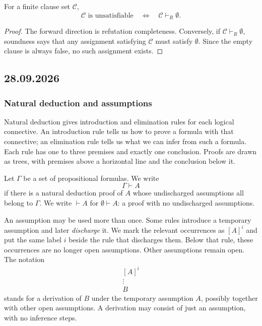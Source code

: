 \documentclass[11pt,a4paper]{amsart}
\begin{document}
\begin{corollary}
  For a finite clause set \(\mathcal C\),
  \[
    \mathcal C\text{ is unsatisfiable}
    \quad\Longleftrightarrow\quad
    \mathcal C\vdash_R\emptyset.
  \]
\end{corollary}

\begin{proof}
  The forward direction is refutation completeness. Conversely, if
  \(\mathcal C\vdash_R\emptyset\), soundness says that any assignment
  satisfying \(\mathcal C\) must satisfy \(\emptyset\). Since the empty
  clause is always false, no such assignment exists.
\end{proof}

\subsection{28.09.2026}

\subsubsection{Natural deduction and assumptions}

Natural deduction gives introduction and elimination rules for each logical
connective. An introduction rule tells us how to prove a formula with that
connective; an elimination rule tells us what we can infer from such a
formula. Each rule has one to three premises and exactly one conclusion.
Proofs are drawn as trees, with premises above a horizontal line and the
conclusion below it.

\begin{definition}[Derivability]
  Let \(\Gamma\) be a set of propositional formulas. We write
  \[
    \Gamma\vdash A
  \]
  if there is a natural deduction proof of \(A\) whose undischarged
  assumptions all belong to \(\Gamma\). We write \(\vdash A\) for
  \(\emptyset\vdash A\): a proof with no undischarged assumptions.
\end{definition}

An assumption may be used more than once. Some rules introduce a temporary
assumption and later \emph{discharge} it. We mark the relevant occurrences
as \([A]^i\) and put the same label \(i\) beside the rule that discharges
them. Below that rule, these occurrences are no longer open assumptions.
Other assumptions remain open. The notation
\[
  \begin{array}{c}[A]^i\\\vdots\\B
  \end{array}
\]
stands for a derivation of \(B\) under the temporary assumption \(A\),
possibly together with other open assumptions. A derivation may consist of
just an assumption, with no inference steps.
\end{document}
